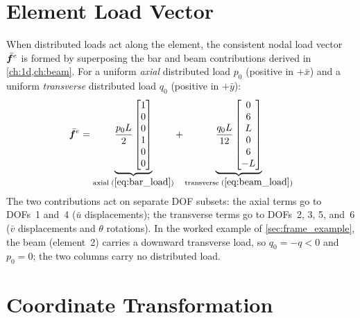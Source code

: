 \section{Element Load Vector}
\label{sec:frame_load}

When distributed loads act along the element, the consistent nodal load
vector $\bar{\bm{f}}^e$ is formed by superposing the bar and beam
contributions derived in \cref{ch:1d,ch:beam}. For a uniform \emph{axial}
distributed load $p_0$ (positive in $+\bar{x}$) and a uniform
\emph{transverse} distributed load $q_0$ (positive in $+\bar{y}$):
\begin{equation}
    \bar{\vect{f}}^e
    =
    \underbrace{
      \frac{p_0 L}{2}
      \begin{bmatrix}1\\0\\0\\1\\0\\0\end{bmatrix}
    }_{\text{axial}\;(\cref{eq:bar_load})}
    +
    \underbrace{
      \frac{q_0 L}{12}
      \begin{bmatrix}0\\6\\L\\0\\6\\{-L}\end{bmatrix}
    }_{\text{transverse}\;(\cref{eq:beam_load})}
    \label{eq:frame_load}
\end{equation}
The two contributions act on separate DOF subsets: the axial terms go to
DOFs~1 and~4 ($\bar{u}$ displacements); the transverse terms go to DOFs~2,
3, 5, and~6 ($\bar{v}$ displacements and $\theta$ rotations).
In the worked example of \cref{sec:frame_example}, the beam (element~2)
carries a downward transverse load, so $q_0 = -q < 0$ and $p_0 = 0$;
the two columns carry no distributed load.

\section{Coordinate Transformation}
\label{sec:frame_transform}

